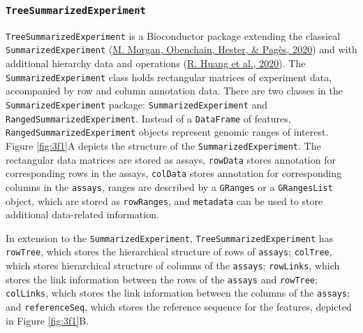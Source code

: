 \documentclass[12pt,twoside]{reedthesis}
\begin{document}
\hypertarget{treesummarizedexperiment}{%
\subsubsection{\texorpdfstring{\texttt{TreeSummarizedExperiment}}{TreeSummarizedExperiment}}\label{treesummarizedexperiment}}

\texttt{TreeSummarizedExperiment} is a Bioconductor package extending the
classical \texttt{SummarizedExperiment} (\protect\hyperlink{ref-morgan2020}{M. Morgan, Obenchain, Hester, \& Pagès, 2020}) and with additional
hierarchy data and operations (\protect\hyperlink{ref-huang2020}{R. Huang et al., 2020}). The \texttt{SummarizedExperiment}
class holds rectangular matrices of experiment data, accompanied by row
and column annotation data. There are two classes in the
\texttt{SummarizedExperiment} package: \texttt{SummarizedExperiment} and
\texttt{RangedSummarizedExperiment}. Instead of a \texttt{DataFrame} of features,
\texttt{RangedSummarizedExperiment} objects represent genomic ranges of interest.
Figure \ref{fig:3f1}A depicts the structure of the \texttt{SummarizedExperiment}. The
rectangular data matrices are stored as assays, \texttt{rowData} stores
annotation for corresponding rows in the assays, \texttt{colData} stores
annotation for corresponding columns in the \texttt{assays}, ranges are described
by a \texttt{GRanges} or a \texttt{GRangesList} object, which are stored as \texttt{rowRanges}, and
\texttt{metadata} can be used to store additional data-related information.

In extension to the \texttt{SummarizedExperiment}, \texttt{TreeSummarizedExperiment} has
\texttt{rowTree}, which stores the hierarchical structure of rows of \texttt{assays};
\texttt{colTree}, which stores hierarchical structure of columns of the \texttt{assays};
\texttt{rowLinks}, which stores the link information between the rows of the
\texttt{assays} and \texttt{rowTree}; \texttt{colLinks}, which stores the link information between
the columns of the \texttt{assays}; and \texttt{referenceSeq}, which stores the reference
sequence for the features, depicted in Figure \ref{fig:3f1}B.
\end{document}
